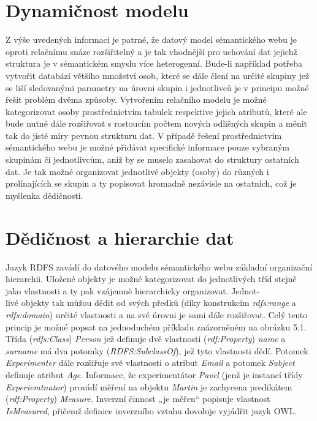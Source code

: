 \documentclass{projekt}
\begin{document}
\section{Dynamičnost modelu}
\hspace{0.65cm}Z výše uvedených informací je patrné, že datový model sémantického webu je oproti relačnímu snáze rozšiřitelný a je tak vhodnější pro uchování dat jejichž struktura je v sémantickém smyslu více heterogenní. Bude-li například potřeba vytvořit databází většího množství osob, které se dále člení na určité skupiny jež se liší sledovanými parametry na úrovni skupin i jednotlivců je v principu možné řešit problém dvěma způsoby. Vytvořením relačního modelu je možné kategorizovat osoby prostřednictvím tabulek respektive jejich  atributů, které ale bude nutné dále rozšiřovat s rostoucím počtem nových odlišných skupin a měnit tak do jisté míry pevnou strukturu dat. V případě řešení prostřednictvím sémantického webu je možné přidávat specifické informace pouze vybraným skupinám či jednotlivcům, aniž by se muselo zasahovat do struktury ostatních dat. Je tak možné organizovat jednotlivé objekty (osoby) do různých i prolínajících se skupin a ty popisovat hromadně nezávisle na ostatních, což je myšlenka dědičnosti.

\section{Dědičnost a hierarchie dat}
\hspace{0.65cm}Jazyk RDFS zavádí do datového modelu sémantického webu základní organizační hierarchii. Uložené objekty je možné kategorizovat do jednotlivých tříd stejně jako vlastnosti a ty pak vzájemně hierarchicky organizovat. Jednot-\\livé objekty tak můžou dědit od svých předků (díky konstrukcím {\it rdfs:range} a {\it rdfs:domain}) určité vlastnosti a na své úrovni je sami dále rozšiřovat. Celý tento princip je možné popsat na jednoduchém příkladu znázorněném na obrázku 5.1. Třída ({\it rdfs:Class}) {\it Person} jež definuje dvě vlastnosti ({\it rdf:Property}) {\it name} a {\it surname} má dva potomky ({\it RDFS:SubclassOf}), jež tyto vlastnosti dědí. Potomek {\it Experimenter} dále rozšiřuje své vlastnosti o atribut {\it Email} a potomek {\it Subject} definuje atribut {\it Age}. Informace, že experimentátor {\it Pavel} (jenž je instancí třídy {\it Experiemtnator}) provádí měření na objektu {\it Martin} je zachycena predikátem ({\it rdf:Property}) {\it Measure}. Inverzní činnost „je měřen“ popisuje vlastnost {\it IsMeasured}, přičemž definice inverzního vztahu dovoluje vyjádřit jazyk OWL.
\end{document}
